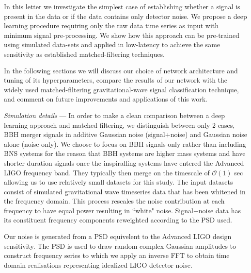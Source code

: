 \documentclass[%
showpacs,
 amsmath,amssymb,
 aps,
 twocolumn,
 prl,
 reprint,
floatfix,
]{revtex4-1}
\begin{document}
%
%
In this letter we investigate the simplest case of establishing whether a
signal is present in the data or if the data contains only detector noise. We
propose a deep learning procedure requiring only the raw data time
series as input with minimum signal pre-processing. We show how this approach
can be pre-trained using simulated data-sets and applied in low-latency 
to achieve the same sensitivity as established matched-filtering techniques. 

%
% 
In the following sections we will discuss our choice of network architecture
and tuning of its hyperparameters, compare the results of our network with the
widely used matched-filtering gravitational-wave signal classification
technique, and comment on future improvements and applications of this work.      

%
%
\textit{Simulation details} --- 
%
%
In order to make a clean comparison between a deep learning approach and
matched filtering, we distinguish between only 2 cases, \ac{BBH} merger signals
in additive Gaussian noise (signal+noise) and Gaussian noise alone
(noise-only). We choose to focus on \ac{BBH} signals only rather than including
\ac{BNS} systems for the reason that \ac{BBH} systems are higher mass systems
and have shorter duration signals once the inspiralling systems have entered
the Advanced LIGO frequency band. They typically then merge on the timescale of
$\mathcal{O}(1)$ sec allowing us to use relatively small datasets for this
study. The input datasets consist of simulated gravitational wave timeseries
data that has been whitened in the frequency domain. This process rescales the
noise contribution at each frequency to have equal power resulting in ``white"
noise. Signal+noise data has its constituent frequency components
reweighted according to the \ac{PSD} used.    

%
%
Our noise is generated from a \ac{PSD} equivelent to the Advanced
LIGO design sensitivity. The \ac{PSD} is used to draw random complex Gaussian
amplitudes to construct frequency series to which we apply an inverse \ac{FFT}
to obtain time domain realisations representing idealized LIGO detector noise.
\end{document}
